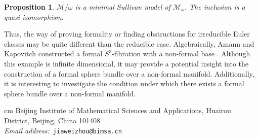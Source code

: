 \documentclass{article}
\theoremstyle{plain}
\newtheorem{prop}[thm]{Proposition}
\theoremstyle{definition}
\theoremstyle{plain}
\numberwithin{equation}{section}
\begin{document}
\begin{prop}
$\mathcal{M}/\omega$ is a minimal Sullivan model of $\mathcal{M}_{\omega}$. The inclusion is a quasi-isomorphism.
\end{prop} 

Thus, the way of proving formality or finding obstructions for irreducible Euler classes may be quite different than the reducible case. Algebraically,  Amann and Kapovitch constructed a formal $S^3$-fibration with a non-formal base \cite[Page 21]{AK}. Although this example is infinite dimensional, it may provide a potential insight into the construction of a formal sphere bundle over a non-formal manifold. Additionally, it is interesting to investigate the condition under which there exists a formal sphere bundle over a non-formal manifold.

 


 cm
\noindent
{Beijing Institute of Mathematical Sciences and Applications, Huairou District, Beijing, China 101408}\\
{\it Email address:}~{\tt jiaweizhou@bimsa.cn}
\end{document}
